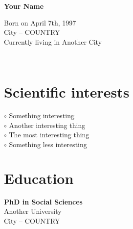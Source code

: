 \documentclass[a4paper,10pt]{article}
\begin{document}
\thispagestyle{empty}

\begin{adjustbox}{valign=t}
\begin{minipage}{0.3\textwidth} %
\begin{center}
\MySkip 	%

{\LARGE \bfseries Your Name}

\MySkip 	%

Born on April 7th, 1997\\
City -- COUNTRY\\
Currently living in Another City\\

\MySkip 	%

\textcolor{ColorTwo}{\faEnvelopeO} 
 \\

\textcolor{ColorTwo}{\faChain} 
\end{center}

\vfill

\section*{Scientific interests}
\raggedright
\textcolor{ColorOne}{$\circ$} Something interesting\\
\textcolor{ColorOne}{$\circ$} Another interesting thing\\
\textcolor{ColorOne}{$\circ$} The most interesting thing\\
\textcolor{ColorOne}{$\circ$} Something less interesting

\vfill

\section*{Education}
	\begin{description}
	\raggedright
	\item [\normalfont \textcolor{ColorOne}{2021.}] \textbf{PhD in
Social Sciences}\\
	Another University\\
	City -- COUNTRY


\end{description}
\end{minipage}
\end{adjustbox}
\end{document}
